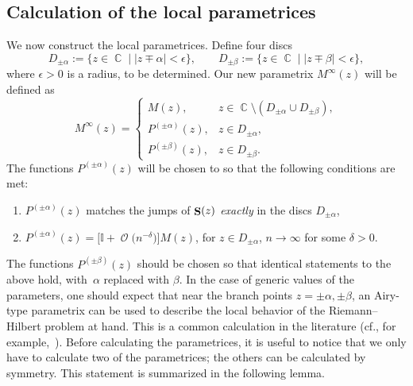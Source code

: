 \documentclass[pdftex]{sigma}
\DeclareMathOperator{\CC}{\mathbb{C}}
\DeclareMathOperator{\OO}{\mathcal{O}}
\DeclareMathOperator{\boldS}{{\bf S}}
\numberwithin{equation}{section}
\begin{document}
\subsection{Calculation of the local parametrices}
We now construct the local parametrices. Define four discs
 \begin{equation*}
 D_{\pm\alpha} := \{z\in\CC \mid |z\mp\alpha| < \epsilon\},\qquad D_{\pm \beta} := \{z\in\CC \mid |z\mp\beta| < \epsilon\},
 \end{equation*}
where $\epsilon>0$ is a radius, to be determined. Our new parametrix $M^{\infty}(z)$ will be defined as
 \begin{equation*}
 M^{\infty}(z) =
 \begin{cases}
 M(z), & z\in \CC \setminus (D_{\pm\alpha} \cup D_{\pm\beta}),\\
 P^{(\pm\alpha)}(z), & z\in D_{\pm\alpha},\\
 P^{(\pm\beta)}(z), & z\in D_{\pm\beta}.
 \end{cases}
 \end{equation*}
The functions $P^{(\pm \alpha)}(z)$ will be chosen to so that the following conditions are met:
 \begin{enumerate}\itemsep=0pt
 \item[$(1)$] $P^{(\pm \alpha)}(z)$ matches the jumps of $\boldS(z)$ \textit{exactly} in the discs $D_{\pm \alpha}$,
 \item[$(2)$] $P^{(\pm \alpha)}(z) = \bigl[\mathbb{I} + \OO\bigl(n^{-\delta}\bigr)\bigr] M(z)$, for $z\in D_{\pm \alpha}$, $n\to \infty$ for some $\delta >0$.
 \end{enumerate}
The functions $P^{(\pm \beta)}(z)$ should be chosen so that identical statements to the above hold, with~$\alpha$ replaced with $\beta$.
In the case of generic values of the parameters, one should expect that near the branch points $z=\pm\alpha,\pm \beta$, an Airy-type parametrix can be used to describe the local behavior of the Riemann--Hilbert problem at hand. This is a common calculation in the literature (cf., for example,~\cite{DKMVZ}).
Before calculating the parametrices, it is useful to notice that we only have to calculate two of the parametrices; the others can be calculated
by symmetry. This statement is summarized in the following lemma.
\end{document}
